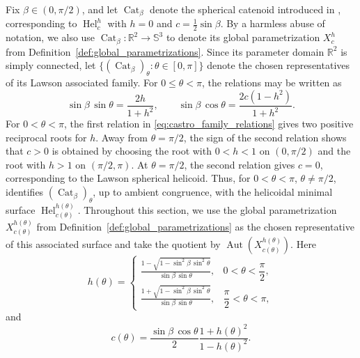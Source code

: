 \documentclass[a4paper,11pt]{amsart}
\numberwithin{equation}{section}
\theoremstyle{plain}
\newcommand{\Cat}{\operatorname{Cat}}
\begin{document}
Fix $\beta\in(0,\pi/2)$, and let $\Cat_\beta$ denote the
spherical catenoid introduced in
\cite[Corollary~3.5 and Definition~3.6]{Castro2024}, corresponding to $\operatorname{Hel}_c^h$ with
$h=0$ and $c=\frac12\sin\beta$. By a harmless abuse of notation, we
also use $\Cat_\beta:\mathbb R^2\longrightarrow\mathbb S^3$ to denote
its global parametrization $X_c^h$ from
Definition~\ref{def:global_parametrizations}. Since its parameter domain
$\mathbb R^2$ is simply connected, let
$\{(\Cat_\beta)_\theta:\theta\in[0,\pi]\}$ denote the chosen
representatives of its Lawson associated family. For $0\leq\theta<\pi$, the relations
\cite[Theorem~5.6 and Eq.~(5.8)]{Castro2024} may be written as
\begin{equation}\label{eq:castro_family_relations}
    \sin\beta\,\sin\theta
    =
    \frac{2h}{1+h^2},
    \qquad
    \sin\beta\,\cos\theta
    =
    \frac{2c(1-h^2)}{1+h^2}.
\end{equation}
For $0<\theta<\pi$, the first relation in
\eqref{eq:castro_family_relations} gives two positive reciprocal roots for
$h$. Away from $\theta=\pi/2$, the sign of the second relation shows that
$c>0$ is obtained by choosing the root with $0<h<1$ on $(0,\pi/2)$ and
the root with $h>1$ on $(\pi/2,\pi)$. At $\theta=\pi/2$, the second
relation gives $c=0$, corresponding to the Lawson spherical helicoid. Thus, for $0<\theta<\pi$, $\theta\neq\pi/2$,
\cite[Theorem~5.6]{Castro2024} identifies $(\Cat_\beta)_\theta$, up to
ambient congruence, with the helicoidal minimal surface
$\operatorname{Hel}_{c(\theta)}^{h(\theta)}$. Throughout this section, we use the global parametrization
$X_{c(\theta)}^{h(\theta)}$ from
Definition~\ref{def:global_parametrizations} as the chosen representative
of this associated surface and take the quotient by
$\operatorname{Aut}(X_{c(\theta)}^{h(\theta)})$. Here
\begin{equation}\label{eq:lawson_h_theta}
h(\theta)
=
\begin{cases}
\displaystyle
\frac{1-\sqrt{1-\sin^2\beta\,\sin^2\theta}}
{\sin\beta\,\sin\theta},
&
0<\theta<\dfrac{\pi}{2},\\[10pt]
\displaystyle
\frac{1+\sqrt{1-\sin^2\beta\,\sin^2\theta}}
{\sin\beta\,\sin\theta},
&
\dfrac{\pi}{2}<\theta<\pi,
\end{cases}
\end{equation}
and
\begin{equation}\label{eq:lawson_c_theta}
    c(\theta)
    =
    \frac{\sin\beta\,\cos\theta}{2}
    \frac{1+h(\theta)^2}{1-h(\theta)^2}.
\end{equation}
\end{document}
